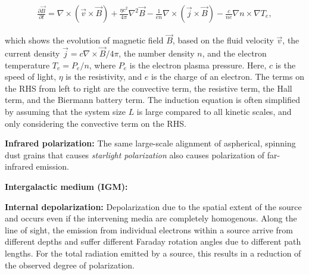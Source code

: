 \documentclass[a4paper,10pt]{article}
\begin{document}
\begin{align*}
    \frac{\partial\vec{B}}{\partial t} = \nabla\times(\vec{v}\times\vec{B}) + \frac{\eta c^2}{4\pi}\nabla^2\vec{B} - \frac{1}{en}\nabla\times(\vec{j}\times\vec{B}) - \frac{c}{ne}\nabla n\times\nabla T_e,
\end{align*}

{\noindent}which shows the evolution of magnetic field $\vec{B}$, based on the fluid velocity $\vec{v}$, the current density $\vec{j}=c\nabla\times\vec{B}/4\pi$, the number density $n$, and the electron temperature $T_e=P_e/n$, where $P_e$ is the electron plasma pressure. Here, $c$ is the speed of light, $\eta$ is the resistivity, and $e$ is the charge of an electron. The terms on the RHS from left to right are the convective term, the resistive term, the Hall term, and the Biermann battery term. The induction equation is often simplified by assuming that the system size $L$ is large compared to all kinetic scales, and only considering the convective term on the RHS. 

{\noindent}\textbf{Infrared polarization:} The same large-scale alignment of aspherical, spinning dust grains that causes \textit{starlight polarization} also causes polarization of far-infrared emission.

{\noindent}\textbf{Intergalactic medium (IGM):} 

{\noindent}\textbf{Internal depolarization:} Depolarization due to the spatial extent of the source and occurs even if the intervening media are completely homogenous. Along the line of sight, the emission from individual electrons within a source arrive from different depths and suffer different Faraday rotation angles due to different path lengths. For the total radiation emitted by a source, this results in a reduction of the observed degree of polarization.
\end{document}
